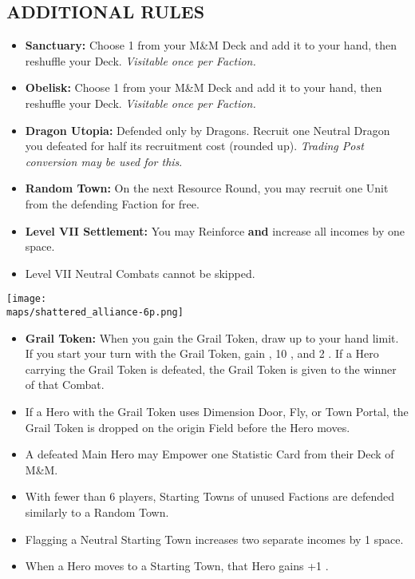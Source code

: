 \begin{multicols*}{2}
\subsection*{\MakeUppercase{Additional Rules}}
\begin{itemize}
  \item \textbf{Sanctuary:} Choose 1  from your M\&M Deck and add it to your hand, then reshuffle your Deck. \textit{Visitable once per Faction.}
  \item \textbf{Obelisk:} Choose 1  from your M\&M Deck and add it to your hand, then reshuffle your Deck. \textit{Visitable once per Faction.}
  \item \textbf{Dragon Utopia:} Defended only by Dragons. Recruit one Neutral Dragon you defeated for half its recruitment cost (rounded up). \textit{Trading Post conversion may be used for this}.
  \item \textbf{Random Town:} On the next Resource Round, you may recruit one Unit from the defending Faction for free.
  \item \textbf{Level VII Settlement:} You may Reinforce \textbf{and} increase all incomes by one space.
  \item Level VII Neutral Combats cannot be skipped.
\end{itemize}

\begin{center}
  \vspace*{\fill}
  \texttt{[image: \\maps/shattered\_alliance-6p.png]}
  \vspace*{\fill}
\end{center}

\columnbreak

\begin{itemize}
  \item \textbf{Grail Token:} When you gain the Grail Token, draw up to your hand limit. If you start your turn with the Grail Token, gain , 10 , and 2 . If a Hero carrying the Grail Token is defeated, the Grail Token is given to the winner of that Combat.
  \item If a Hero with the Grail Token uses Dimension Door, Fly, or Town Portal, the Grail Token is dropped on the origin Field before the Hero moves.
  \item A defeated Main Hero may Empower one Statistic Card from their Deck of M\&M.
  \item With fewer than 6 players, Starting Towns of unused Factions are defended similarly to a Random Town.
  \item Flagging a Neutral Starting Town increases two separate incomes by 1 space.
  \item When a Hero moves to a Starting Town, that Hero gains +1 .
\end{itemize}


\end{multicols*}

